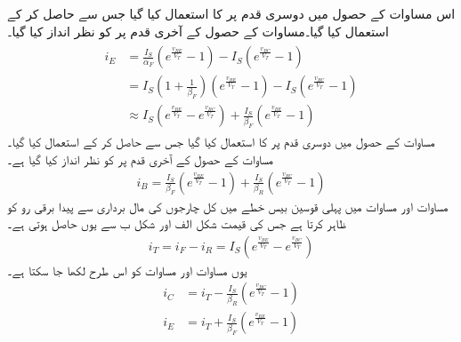 اس مساوات کے حصول میں دوسری قدم پر  کا استعمال کیا گیا جس سے  حاصل کر کے استعمال کیا گیا۔مساوات کے حصول کے آخری قدم پر  کو نظر انداز کیا گیا۔
\begin{gather} \label{مساوات_ٹرانزسٹر_چارجوں_کی_مال_برداری_اور_مخارج_رو}
\begin{aligned}
i_E &=\frac{I_S}{\alpha_F} \left(e^{\frac{v_{BE}}{V_T}}-1 \right )-I_S \left(e^{\frac{v_{BC}}{V_T}}-1 \right )\\
&=I_S \left(1+\frac{1}{\beta_F} \right ) \left(e^{\frac{v_{BE}}{V_T}}-1 \right ) -I_S \left(e^{\frac{v_{BC}}{V_T}}-1 \right )\\
&\approx I_S \left(e^{\frac{v_{BE}}{V_T}}-e^{\frac{v_{BC}}{V_T}} \right ) +\frac{I_S}{\beta_F} \left(e^{\frac{v_{BE}}{V_T}}-1 \right )
\end{aligned}
\end{gather}
مساوات  کے حصول میں دوسری قدم پر  کا استعمال کیا گیا جس سے  حاصل کر کے استعمال کیا گیا۔مساوات کے حصول کے آخری قدم پر  کو نظر انداز کیا گیا ہے۔
\begin{align} \label{مساوات_ٹرانزسٹر_چارجوں_کی_مال_برداری_اور_قابو_رو}
i_B =\frac{I_S}{\beta_F}\left(e^{\frac{v_{BE}}{V_T}}-1 \right ) +\frac{I_S}{\beta_R} \left(e^{\frac{v_{BC}}{V_T}}-1 \right )
\end{align}
مساوات   اور مساوات  میں پہلی  قوسین بیس خطے میں کل چارجوں کی مال برداری سے پیدا برقی رو    کو ظاہر کرتا ہے جس کی قیمت شکل  الف اور شکل  ب سے یوں حاصل ہوتی ہے۔
\begin{align}
i_T =i_F-i_R =I_S \left(e^{\frac{v_{BE}}{V_T}}-e^{\frac{v_{BC}}{V_T}} \right )
\end{align}
یوں مساوات  اور مساوات   کو اس طرح لکھا جا سکتا ہے۔
\begin{align}
i_C&=i_T-\frac{I_S}{\beta_R} \left(e^{\frac{v_{BC}}{V_T}}-1 \right )\\
i_E&=i_T+\frac{I_S}{\beta_F} \left(e^{\frac{v_{BE}}{V_T}}-1 \right )
\end{align}


